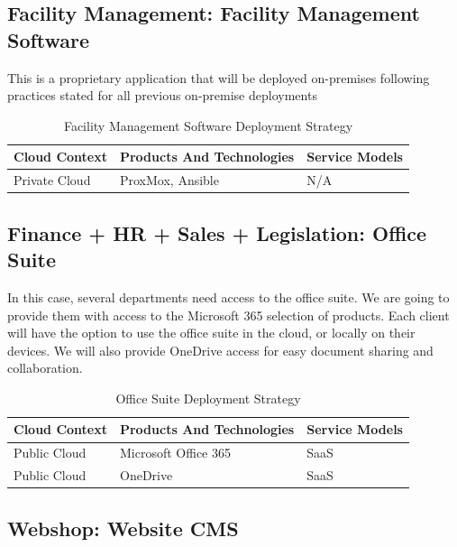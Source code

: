 \documentclass{llncs}
\begin{document}
\subsection{Facility Management: Facility Management Software}
This is a proprietary application that will be deployed on-premises following practices stated for all previous on-premise deployments\\
\begin{table}[h!]
    \centering
    \begin{tabular}{lll}
        \hline
        \textbf{Cloud Context} & \textbf{Products And Technologies} & \textbf{Service Models} \\
        \hline
 Private Cloud          & ProxMox, Ansible                   & N/A                     \\
        \hline
    \end{tabular}
    \caption{Facility Management Software Deployment Strategy}
\end{table}

\subsection{Finance + HR + Sales + Legislation: Office Suite}
In this case, several departments need access to the office suite. We are going to provide them with access to the Microsoft 365 selection of products.
Each client will have the option to use the office suite in the cloud, or locally on their devices. We will also provide OneDrive access for easy document sharing and collaboration.\\

\begin{table}[h!]
    \centering
    \begin{tabular}{lll}
        \hline
        \textbf{Cloud Context} & \textbf{Products And Technologies} & \textbf{Service Models} \\
        \hline
 Public Cloud           & Microsoft Office 365               & SaaS                    \\
        \hline
 Public Cloud           & OneDrive                           & SaaS                    \\
        \hline
    \end{tabular}
    \caption{Office Suite Deployment Strategy}
\end{table}

\subsection{Webshop: Website CMS}
\end{document}
